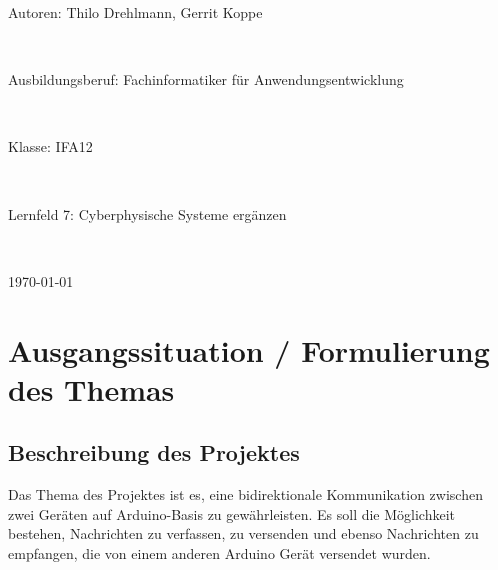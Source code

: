\documentclass[a4paper, 11pt]{scrartcl}
\begin{document}
\begin{center}
    \vspace{0.1\textheight}
    \begin{Large}
        Autoren: Thilo Drehlmann, Gerrit Koppe
    \end{Large}
    \\
    \vspace{0.5cm}
    \begin{Large}
        Ausbildungsberuf: Fachinformatiker für Anwendungsentwicklung
    \end{Large}
    \\
    \vspace{0.5cm}
    \begin{Large}
        Klasse: IFA12
    \end{Large}
    \\
    \vspace{0.5cm}
    \begin{Large}
        Lernfeld 7: Cyberphysische Systeme ergänzen
    \end{Large}
    \\
    \vspace{0.5cm}
    \begin{Large}
        \today
    \end{Large}
\end{center}
\newpage
\thispagestyle{empty}
\tableofcontents
\newpage
\clearpage
{}

\section{Ausgangssituation / Formulierung des Themas}
\subsection{Beschreibung des Projektes}
Das Thema des Projektes ist es, eine bidirektionale Kommunikation zwischen zwei Geräten auf Arduino-Basis zu gewährleisten. Es soll die Möglichkeit bestehen,
Nachrichten zu verfassen, zu versenden und ebenso Nachrichten zu empfangen, die von einem anderen Arduino Gerät versendet wurden.
\end{document}
